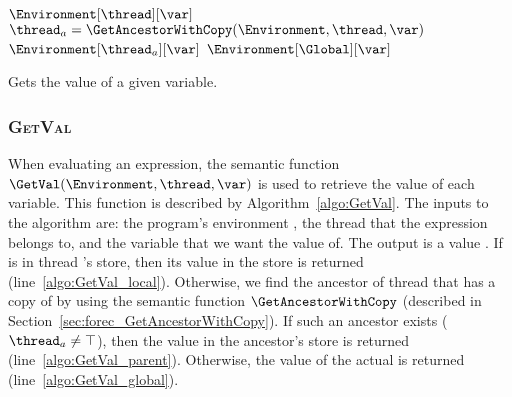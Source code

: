 \begin{algorithm}[t]
	\begin{algorithmic}[1]
		\Function{$\GetVal$}{\Environment{}, \thread{}, \var{}}
			\If {$\var \in \Environment[\thread]$}	
				\State \Return $\Environment[\thread][\var]$							\label{algo:GetVal_local}
			\Else
				\State $\thread_a = \GetAncestorWithCopy(\Environment, \thread, \var)$	
					\State \Return $\Environment[\thread_a][\var]$						\label{algo:GetVal_parent}
				\Else
					\State \Return $\Environment[\Global][\var]$						\label{algo:GetVal_global}
				\EndIf
			\EndIf
		\EndFunction
	\end{algorithmic}
	
	\caption{Gets the value of a given variable.}
	\label{algo:GetVal}
\end{algorithm}

\subsubsection{\textsc{GetVal}}
\label{sec:forec_GetVal}
When evaluating an expression, the semantic function
$\GetVal(\Environment, \thread, \var)$ is used 
to retrieve the value of each variable. 
This function is described by Algorithm~\ref{algo:GetVal}. 
The inputs to the algorithm are: the program's environment 
\Environment{}, the thread \thread{} that the expression 
belongs to, and the variable \var{} that we want the value 
of. The output is a value \val{}. If \var{} is in thread 
\thread{}'s store, then its value in the store is returned 
(line~\ref{algo:GetVal_local}). Otherwise, we find the ancestor of
thread \thread{} that has a copy of \var{} by using the
semantic function $\GetAncestorWithCopy$ 
(described in Section~\ref{sec:forec_GetAncestorWithCopy}). 
If such an ancestor exists ($\thread_a \neq \top$), then
the value in the ancestor's store is returned (line~\ref{algo:GetVal_parent}). 
Otherwise, the value of the actual \var{} is returned
(line~\ref{algo:GetVal_global}).

